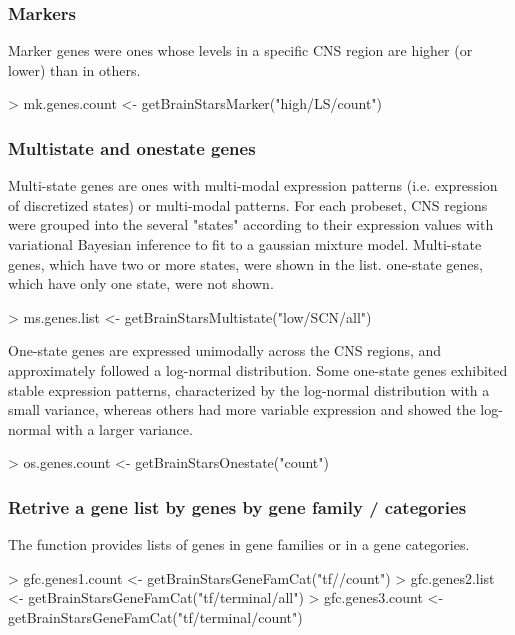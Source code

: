 \documentclass[12pt,fullpage]{article}
\begin{document}
\subsubsection{Markers}
Marker genes were ones whose levels in a specific CNS region are higher (or lower) than in others.
\begin{Schunk}
\begin{Sinput}
> mk.genes.count <- getBrainStarsMarker("high/LS/count")
\end{Sinput}
\end{Schunk}
\subsubsection{Multistate and onestate genes}
Multi-state genes are ones with multi-modal expression patterns (i.e. expression of discretized states) or multi-modal patterns. For each probeset, CNS regions were grouped into the several "states" according to their expression values with variational Bayesian inference to fit to a gaussian mixture model. Multi-state genes, which have two or more states, were shown in the list. one-state genes, which have only one state, were not shown.
\begin{Schunk}
\begin{Sinput}
> ms.genes.list <- getBrainStarsMultistate("low/SCN/all")
\end{Sinput}
\end{Schunk}

One-state genes are expressed unimodally across the CNS regions, and approximately followed a log-normal distribution. Some one-state genes exhibited stable expression patterns, characterized by the log-normal distribution with a small variance, whereas others had more variable expression and showed the log-normal with a larger variance.
\begin{Schunk}
\begin{Sinput}
> os.genes.count <- getBrainStarsOnestate("count")
\end{Sinput}
\end{Schunk}

\subsubsection{Retrive a gene list by genes by gene family / categories}
The function provides lists of genes in gene families or in a gene categories. 
\begin{Schunk}
\begin{Sinput}
> gfc.genes1.count <- getBrainStarsGeneFamCat("tf//count")
> gfc.genes2.list <- getBrainStarsGeneFamCat("tf/terminal/all")
> gfc.genes3.count <- getBrainStarsGeneFamCat("tf/terminal/count")
\end{Sinput}
\end{Schunk}
\end{document}
